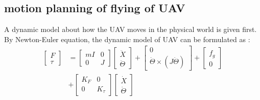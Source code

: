 \documentclass{ieeeaccess}
\begin{document}
\subsection{motion planning of flying of UAV}
A dynamic model about how the UAV moves in the physical world is given first. By Newton-Euler equation, the dynamic model of UAV can be formulated as \cite{sabatino2015quadrotor}:
\begin{equation} \label{eq:uav} 
    \begin{split}
        \begin{bmatrix}
            F \\ \tau
        \end{bmatrix}&=\begin{bmatrix}
            mI & 0 \\ 0 & J
        \end{bmatrix}\begin{bmatrix}
            \ddot{X} \\ \ddot{\Theta}
        \end{bmatrix}+\begin{bmatrix}
            0 \\ \dot{\Theta}\times(J\dot{\Theta})
        \end{bmatrix}+\begin{bmatrix}
            f_g \\ 0
        \end{bmatrix}
        \\
        &+\begin{bmatrix}
            K_F & 0 \\
            0 & K_\tau
        \end{bmatrix}\begin{bmatrix}
            \dot{X} \\ \dot{\Theta}
        \end{bmatrix}
    \end{split}
\end{equation}
\end{document}
